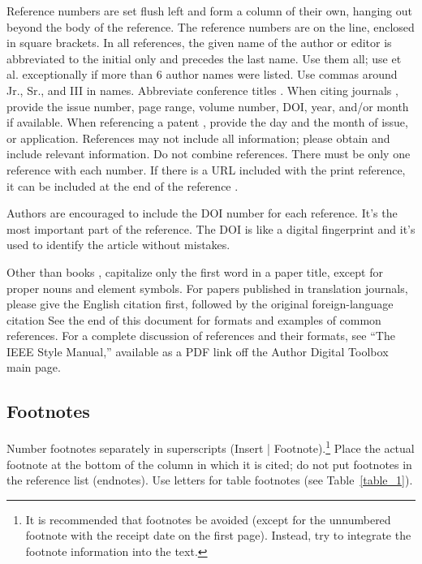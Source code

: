 \documentclass[journal]{IEEEtranTICPS}
\begin{document}
Reference numbers are set flush left and form a column of their own, hanging out beyond the body of the reference. The reference numbers are on the line, enclosed in square brackets. In all references, the given name of the author or editor is abbreviated to the initial only and precedes the last name. Use them all; use et al. exceptionally if more than 6 author names were listed. Use commas around Jr., Sr., and III in names. Abbreviate conference titles \cite{inproceedings1}.  When citing journals \cite{article2, article3, article4, article5, article6, article7, article8, article9, article10}, provide the issue number, page range, volume number, DOI, year, and/or month if available. When referencing a patent \cite{patent1}, provide the day and the month of issue, or application. References may not include all information; please obtain and include relevant information. Do not combine references. There must be only one reference with each number. If there is a URL included with the print reference, it can be included at the end of the reference \cite{onlinebook1}.

Authors are encouraged to include the DOI number for each reference. It's the most important part of the reference. The DOI is like a digital fingerprint and it's used to identify the article without mistakes.

Other than books \cite{inbook1, book1, book2, book3}, capitalize only the first word in a paper title, except for proper nouns and element symbols. For papers published in translation journals, please give the English citation first, followed by the original foreign-language citation See the end of this document for formats and examples of common references. For a complete discussion of references and their formats, see ``The IEEE Style Manual,'' available as a PDF link off the Author Digital Toolbox main page.

\subsection{Footnotes}
Number footnotes separately in superscripts (Insert | Footnote).\footnote{It is recommended that footnotes be avoided (except for the unnumbered footnote with the receipt date on the first page). Instead, try to integrate the footnote information into the text.}  Place the actual footnote at the bottom of the column in which it is cited; do not put footnotes in the reference list (endnotes). Use letters for table footnotes  (see \mbox{Table \ref{table_1}}).
\end{document}
